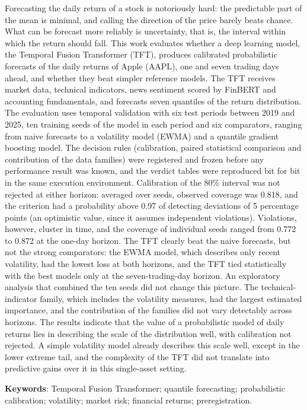 \begin{resumo}[Abstract]

Forecasting the daily return of a stock is notoriously hard: the predictable part of the mean is minimal, and calling the direction of the price barely beats chance. What can be forecast more reliably is uncertainty, that is, the interval within which the return should fall. This work evaluates whether a deep learning model, the Temporal Fusion Transformer (TFT), produces calibrated probabilistic forecasts of the daily returns of Apple (AAPL), one and seven trading days ahead, and whether they beat simpler reference models. The TFT receives market data, technical indicators, news sentiment scored by FinBERT and accounting fundamentals, and forecasts seven quantiles of the return distribution. The evaluation uses temporal validation with six test periods between 2019 and 2025, ten training seeds of the model in each period and six comparators, ranging from naive forecasts to a volatility model (EWMA) and a quantile gradient boosting model. The decision rules (calibration, paired statistical comparison and contribution of the data families) were registered and frozen before any performance result was known, and the verdict tables were reproduced bit for bit in the same execution environment. Calibration of the 80\% interval was not rejected at either horizon: averaged over seeds, observed coverage was 0.818, and the criterion had a probability above 0.97 of detecting deviations of 5 percentage points (an optimistic value, since it assumes independent violations). Violations, however, cluster in time, and the coverage of individual seeds ranged from 0.772 to 0.872 at the one-day horizon. The TFT clearly beat the naive forecasts, but not the strong comparators: the EWMA model, which describes only recent volatility, had the lowest loss at both horizons, and the TFT tied statistically with the best models only at the seven-trading-day horizon. An exploratory analysis that combined the ten seeds did not change this picture. The technical-indicator family, which includes the volatility measures, had the largest estimated importance, and the contribution of the families did not vary detectably across horizons. The results indicate that the value of a probabilistic model of daily returns lies in describing the scale of the distribution well, with calibration not rejected. A simple volatility model already describes this scale well, except in the lower extreme tail, and the complexity of the TFT did not translate into predictive gains over it in this single-asset setting.

\textbf{Keywords}: Temporal Fusion Transformer; quantile forecasting; probabilistic calibration; volatility; market risk; financial returns; preregistration.

\end{resumo}
